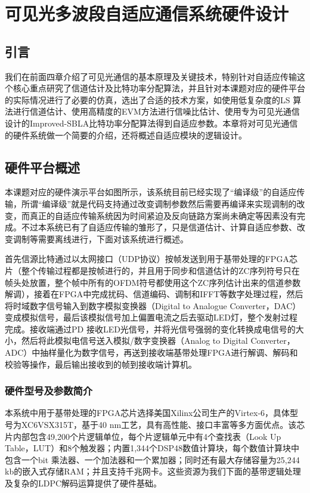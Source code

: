 \chapter{可见光多波段自适应通信系统硬件设计}
\section{引言}
我们在前面四章介绍了可见光通信的基本原理及关键技术，特别针对自适应传输这个核心重点研究了信道估计及比特功率分配算法，并且针对本课题对应的硬件平台的实际情况进行了必要的仿真，选出了合适的技术方案，如使用低复杂度的LS 算法进行信道估计、使用高精度的EVM方法进行信噪比估计、使用专为可见光通信设计的Improved-SBLA比特功率分配算法得到自适应参数。本章将对可见光通信的硬件系统做一个简要的介绍，还将概述自适应模块的逻辑设计。
\section{硬件平台概述}
本课题对应的硬件演示平台如图所示，该系统目前已经实现了“编译级”的自适应传输，所谓“编译级”就是代码支持通过改变调制参数然后需要再编译来实现调制的改变，而真正的自适应传输系统因为时间紧迫及反向链路方案尚未确定等因素没有完成。不过本系统已有了自适应传输的雏形了，只是信道估计、计算自适应参数、改变调制等需要离线进行，下面对该系统进行概述。

首先信源比特通过以太网接口（UDP协议）按帧发送到用于基带处理的FPGA芯片（整个传输过程都是按帧进行的，并且用于同步和信道估计的ZC序列符号只在帧头处放置，整个帧中所有的OFDM符号都使用这个ZC序列估计出来的信道参数解调），接着在FPGA中完成扰码、信道编码、调制和IFFT等数字处理过程，然后将时域数字信号输入到数字模拟变换器（Digital to Analogue Converter，DAC）变成模拟信号，最后该模拟信号加上偏置电流之后去驱动LED灯，整个发射过程完成。接收端通过PD 接收LED光信号，并将光信号强弱的变化转换成电信号的大小，然后将此模拟电信号送入模拟/数字变换器（Analog to Digital Converter，ADC）中抽样量化为数字信号，再送到接收端基带处理FPGA进行解调、解码和校验等操作，最后输出接收到的帧到接收端计算机。
\subsection{硬件型号及参数简介}
本系统中用于基带处理的FPGA芯片选择美国Xilinx公司生产的Virtex-6，具体型号为XC6VSX315T，基于40 nm工艺，具有高性能、接口丰富等多方面优点。该芯片内部包含49,200个片逻辑单位，每个片逻辑单元中有4个查找表（Look Up Table，LUT）和8个触发器；内置1,344个DSP48数值计算块，每个数值计算块中包含一个bit 乘法器、一个加法器和一个累加器；同时还有最大存储容量为25,244 kb的嵌入式存储RAM；并且支持千兆网卡\cite{FPGAIntroduciton}。这些资源为我们下面的基带逻辑处理及复杂的LDPC解码运算提供了硬件基础。

